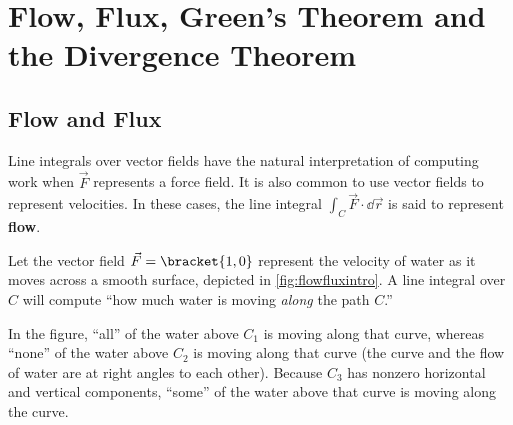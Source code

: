 \section{Flow, Flux, Green's Theorem and the Divergence Theorem}\label{sec:greensthm}

\subsection{Flow and Flux}


Line integrals over vector fields have the natural interpretation of computing work when $\vec F$ represents a force field. It is also common to use vector fields to represent velocities. In these cases, the line integral $\int_C \vec F\cdot\dd\vec r$ is said to represent \textbf{flow}.

Let the vector field $\vec F=\bracket{1,0}$ represent the velocity of water as it moves across a smooth surface, depicted in \autoref{fig:flowfluxintro}. A line integral over $C$ will compute ``how much water is moving \emph{along} the path $C$.'' 

In the figure, ``all'' of the water above $C_1$ is moving along that curve, whereas ``none'' of the water above $C_2$ is moving along that curve (the curve and the flow of water are at right angles to each other). Because $C_3$ has nonzero horizontal and vertical components, ``some'' of the water above that curve is moving along the curve.

